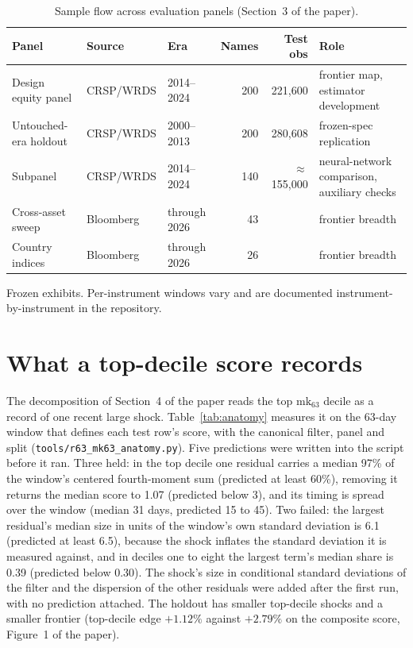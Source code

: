\documentclass[11pt]{article}
\begin{document}
\begin{table}[h]
\centering\small
\begin{threeparttable}
\caption{Sample flow across evaluation panels (Section~3 of the paper).}
\label{tab:sampleflow}
\footnotesize\setlength{\tabcolsep}{4pt}
\begin{tabular}{lllrrl}
\toprule
Panel & Source & Era & Names & Test obs & Role \\
\midrule
Design equity panel & CRSP/WRDS & 2014--2024 & 200 & 221{,}600 & frontier map, estimator development \\
Untouched-era holdout & CRSP/WRDS & 2000--2013 & 200 & 280{,}608 & frozen-spec replication \\
Subpanel & CRSP/WRDS & 2014--2024 & 140 & $\approx$155{,}000 & neural-network comparison, auxiliary checks \\
Cross-asset sweep & Bloomberg & through 2026 & 43 & \tnote{a} & frontier breadth \\
Country indices & Bloomberg & through 2026 & 26 & \tnote{a} & frontier breadth \\
\bottomrule
\end{tabular}
\begin{tablenotes}\footnotesize
\item[a] Frozen exhibits. Per-instrument windows vary and are documented instrument-by-instrument in the repository.
\end{tablenotes}
\end{threeparttable}
\end{table}

\section{What a top-decile score records}
The decomposition of Section~4 of the paper reads the top $\mathrm{mk}_{63}$ decile as a record of one recent large shock. Table~\ref{tab:anatomy} measures it on the 63-day window that defines each test row's score, with the canonical filter, panel and split (\texttt{tools/r63\_mk63\_anatomy.py}). Five predictions were written into the script before it ran. Three held: in the top decile one residual carries a median 97\% of the window's centered fourth-moment sum (predicted at least 60\%), removing it returns the median score to 1.07 (predicted below 3), and its timing is spread over the window (median 31 days, predicted 15 to 45). Two failed: the largest residual's median size in units of the window's own standard deviation is 6.1 (predicted at least 6.5), because the shock inflates the standard deviation it is measured against, and in deciles one to eight the largest term's median share is 0.39 (predicted below 0.30). The shock's size in conditional standard deviations of the filter and the dispersion of the other residuals were added after the first run, with no prediction attached. The holdout has smaller top-decile shocks and a smaller frontier (top-decile edge $+1.12\%$ against $+2.79\%$ on the composite score, Figure~1 of the paper).
\end{document}
